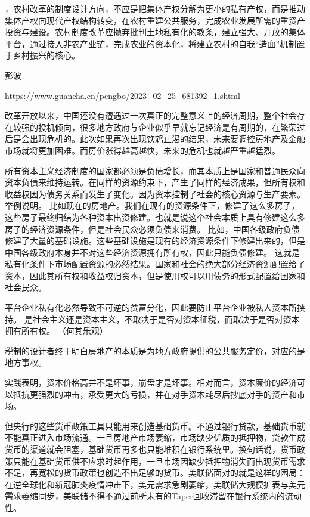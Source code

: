 ，农村改革的制度设计方向，不应是把集体产权分解为更小的私有产权，而是推动集体产权向现代产权结构转变，在农村重建公共服务，完成农业发展所需的重资产投资与建设。农村制度改革应抛弃批判土地私有化的教条，建立强大、开放的集体平台，通过接入非农产业链，完成农业的资本化，将建立农村的自我“造血”机制置于乡村振兴的核心。




彭波

https://www.guancha.cn/pengbo/2023_02_25_681392_1.shtml

改革开放以来，中国还没有遭遇过一次真正的完整意义上的经济周期，整个社会存在较强的投机倾向，很多地方政府与企业似乎早就忘记经济是有周期的，在繁荣过后是会出现危机的。此次如果再次出现饮鸩止渴的结果，未来要调控房地产及金融市场就将更加困难。而房价涨得越高越快，未来的危机也就越严重越猛烈。


所有资本主义经济制度的国家都必须是负债增长，而其本质上是国家和普通民众向资本负债来维持运转。在同样的资源约束下，产生了同样的经济成果，但所有权和收益权因为债务关系而发生了变化。因为资本控制了社会的核心资源与生产要素。
举例说明。
比如现在的房地产。我们在现有的资源条件下，修建了这么多房子，这些房子最终归结为各种资本出资修建。也就是说这个社会本质上具有修建这么多房子的经济资源条件，但是社会民众必须负债来消费。
比如，中国各级政府负债修建了大量的基础设施。这些基础设施是现有的经济资源条件下修建出来的，但是中国各级政府本身并不对这些经济资源拥有所有权，因此只能负债修建。
这就是私有化条件下市场配置资源的必然结果。国家和社会的绝大部分经济资源配置给了资本，因此其所有权和收益权归资本，但是使用权可以用债务的形式配置给国家和社会民众。

平台企业私有化必然导致不可逆的贫富分化，因此要防止平台企业被私人资本所挟持。
是社会主义还是资本主义，不取决于是否对资本征税，而取决于是否对资本拥有所有权。
（何其乐观）

税制的设计者终于明白房地产的本质是为地方政府提供的公共服务定价，对应的是地方事权。

实践表明，资本价格高并不是坏事，崩盘才是坏事。相对而言，资本廉价的经济可以抵抗更强烈的冲击，承受更大的亏损，并在对手资本耗尽后抄底对手的资产和市场。

但央行的这些货币政策工具只能用来创造基础货币。不通过银行贷款，基础货币就不能真正进入市场流通。一旦房地产市场萎缩，市场缺少优质的抵押物，贷款生成货币的渠道就会阻塞，基础货币再多也只能堆积在银行系统里。换句话说，货币政策只能在基础货币供不应求时起作用，一旦市场因缺少抵押物消失而出现货币需求不足，再宽松的货币政策也创造不出足够的货币。美联储面对的就是这样的困局：在逆全球化和新冠肺炎疫情冲击下，美元需求急剧萎缩，美联储大规模扩表与美元需求萎缩同步，美联储不得不通过前所未有的Taper回收滞留在银行系统内的流动性。

